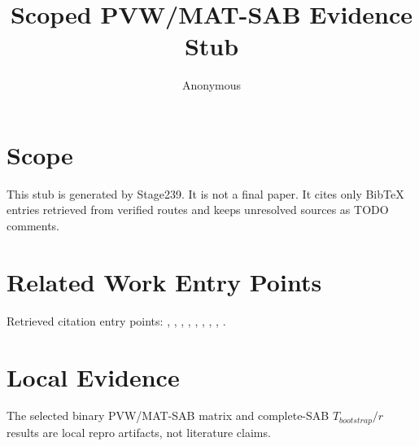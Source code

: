 \documentclass{article}
\title{Scoped PVW/MAT-SAB Evidence Stub}
\author{Anonymous}
\date{}
\begin{document}
\maketitle

\section{Scope}
This stub is generated by Stage239. It is not a final paper. It cites only
BibTeX entries retrieved from verified routes and keeps unresolved sources as
TODO comments.

\section{Related Work Entry Points}
Retrieved citation entry points: \cite{DBLP:conf/ccs/GuimaraesP25}, \cite{DBLP:journals/tches/PaivaMHSY25}, \cite{DBLP:journals/tches/BergeratBCOPT25}, \cite{DBLP:conf/pkc/BrakerskiGH13}, \cite{DBLP:journals/joc/ChillottiGGI20}, \cite{DBLP:conf/icalp/MicciancoS18}, \cite{DBLP:conf/asiacrypt/GuimaraesPL23}, \cite{DBLP:conf/pkc/MicheliKMS24}, \cite{DBLP:conf/asiacrypt/LiuW23}.


\section{Local Evidence}
The selected binary PVW/MAT-SAB matrix and complete-SAB $T_{bootstrap}/r$
results are local repro artifacts, not literature claims.



\end{document}
